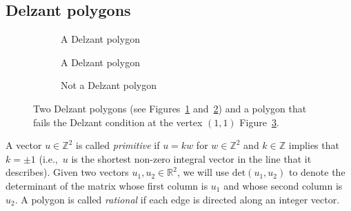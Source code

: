 \documentclass[10pt,a4paper]{amsart}
\numberwithin{equation}{section}
\def\Z{{\mathbb Z}}
\theoremstyle{definition}
\theoremstyle{plain}
\theoremstyle{plain}
\begin{document}
\subsection{Delzant polygons}
\label{sec:delzant-poly}


 \begin{figure}
 \centering
 \begin{subfigure}{.3\textwidth}
 \centering
 \caption{A Delzant polygon}
 \label{fig:delz1}
 \end{subfigure}
 \begin{subfigure}{.3\textwidth}
 \centering
 \caption{A Delzant polygon}
 \label{fig:delz2}
 \end{subfigure}
 \begin{subfigure}{.3\textwidth}
 \centering
 \caption{Not a Delzant polygon}
 \label{fig:not-delz}
 \end{subfigure}
 \caption{Two Delzant polygons (see Figures~\ref{fig:delz1} and~\ref{fig:delz2}) and a polygon that fails the Delzant condition at the vertex $(1,1)$ Figure~\ref{fig:not-delz}.}
 \label{fig:delz-poly-examples}
 \end{figure}

A vector $u\in\mathbb{Z}^2$ is called \emph{primitive} if $u = kw$ for $w\in\mathbb{Z}^2$ and $k\in\Z$ implies that $k=\pm 1$ (i.e.,~$u$ is the shortest non-zero integral vector in the line that it describes). Given two vectors $u_1,u_2\in\mathbb{R}^2$, we will use $\mathrm{det}(u_1,u_2)$ to denote the determinant of the matrix whose first column is $u_1$ and whose second column is $u_2$.
A polygon is called \emph{rational} if each edge is directed along an integer vector.
\end{document}
